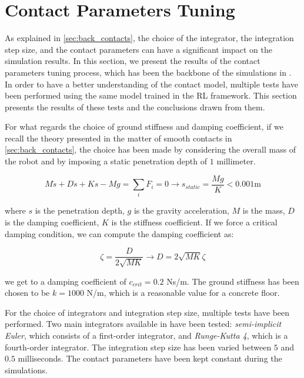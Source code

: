 \chapter{Contact Parameters Tuning}

As explained in \cref{sec:back_contacts}, the choice of the integrator, the integration step size, and the contact parameters can have a significant impact on the simulation results. In this section, we present the results of the contact parameters tuning process, which has been the backbone of the simulations in \jaxsim.
In order to have a better understanding of the contact model, multiple tests have been performed using the same model trained in the \ac{RL} framework. This section presents the results of these tests and the conclusions drawn from them.

For what regards the choice of ground stiffness and damping coefficient, if we recall the theory presented in the matter of smooth contacts in \cref{sec:back_contacts}, the choice has been made by considering the overall mass of the robot and by imposing a static penetration depth of $1$ millimeter.

\begin{equation}
    M\ddot{s} + D\dot{s} + Ks - Mg = \sum _i F _i = 0 \rightarrow s _{static} = \frac{Mg}{K} < 0.001 \text{m}
\end{equation}

where $s$ is the penetration depth, $g$ is the gravity acceleration, $M$ is the mass, $D$ is the damping coefficient, $K$ is the stiffness coefficient.
If we force a critical damping condition, we can compute the damping coefficient as:

\begin{equation}
    \zeta = \frac{D}{2\sqrt{MK}} \rightarrow D = 2\sqrt{MK}\zeta
\end{equation}

we get to a damping coefficient of $c_{crit} = 0.2$ Ns/m. The ground stiffness has been chosen to be $k = 1000$ N/m, which is a reasonable value for a concrete floor.

For the choice of integrators and integration step size, multiple tests have been performed. Two main integrators available in \jaxsim have been tested: \textit{semi-implicit Euler}, which consists of a first-order integrator, and \textit{Runge-Kutta 4}, which is a fourth-order integrator. The integration step size has been varied between $5$ and $0.5$ milliseconds. The contact parameters have been kept constant during the simulations.

